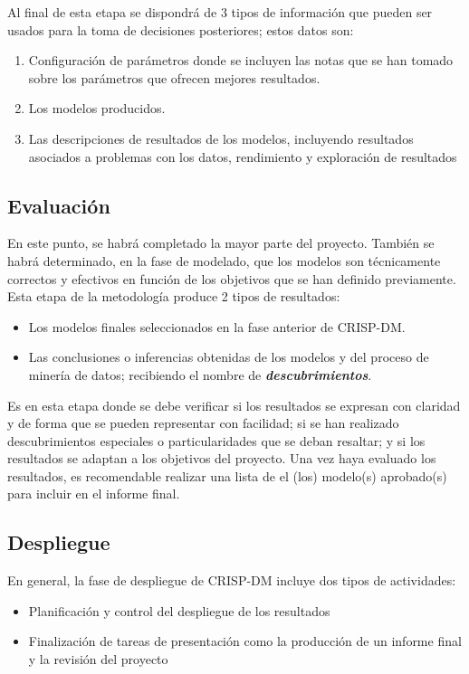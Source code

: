 Al final de esta etapa se dispondrá de 3 tipos de información que pueden ser usados para la toma de decisiones posteriores; estos datos son:
\begin{enumerate}
    \item Configuración de parámetros donde se incluyen las notas que se han tomado sobre los parámetros que ofrecen mejores resultados.
    \item Los modelos producidos.
    \item Las descripciones de resultados de los modelos, incluyendo resultados asociados a problemas con los datos, rendimiento y exploración de resultados
\end{enumerate}

\subsection{Evaluación}

En este punto, se habrá completado la mayor parte del proyecto. También se habrá determinado, en la fase de modelado, que los modelos son técnicamente correctos y efectivos en función de los objetivos que se han definido previamente. Esta etapa de la metodología produce 2 tipos de resultados: \begin{itemize}
    \item Los modelos finales seleccionados en la fase anterior de CRISP-DM.
    \item Las conclusiones o inferencias obtenidas de los modelos y del proceso de minería de datos; recibiendo el nombre de \textit{\textbf{descubrimientos}}.
\end{itemize}

Es en esta etapa donde se debe verificar si los resultados se expresan con claridad y de forma que se pueden representar con facilidad; si se han realizado descubrimientos especiales o particularidades que se deban resaltar; y si los resultados se adaptan a los objetivos del proyecto. Una vez haya evaluado los resultados, es recomendable realizar una lista de el (los) modelo(s) aprobado(s) para incluir en el informe final.


\subsection{Despliegue}
En general, la fase de despliegue de CRISP-DM incluye dos tipos de actividades:
\begin{itemize}
    \item Planificación y control del despliegue de los resultados
    \item Finalización de tareas de presentación como la producción de un informe final y la revisión del proyecto
\end{itemize}
